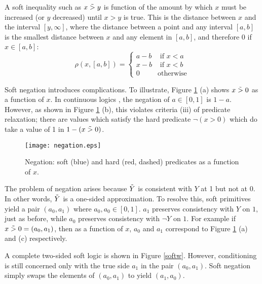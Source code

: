 A soft inequality such as $x \mathrel{\tilde{>}} y$ is function of the amount by which $x$ must be increased (or $y$ decreased) until $x > y$ is true.
This is the distance between $x$ and the interval $[y, \infty]$, where the distance between a point and any interval $[a, b]$ is the smallest distance between $x$ and any element in $[a, b]$, and therefore 0 if $x \in [a, b]$:
\begin{equation}
\rho(x, [a, b]) =
\begin{cases}
  a - b & \text{ if } x < a\\
  x - b & \text{ if } x < b\\
  0              & \text{otherwise}
\end{cases}
\end{equation}

Soft negation introduces complications.
To illustrate, Figure \ref{negationimg} (a) shows $x \mathrel{\tilde{>}} 0$ as a function of $x$.
In continuous logics \cite{kimmig2012short}, the negation of $a \in [0, 1]$ is $1 - a$.
However, as shown in Figure \ref{negationimg} (b), this violates criteria (iii) of predicate relaxation; there are values which satisfy the hard predicate $\neg(x > 0)$ which do take a value of 1 in $1 - (x \mathrel{\tilde{>}} 0)$.


\begin{figure}
\texttt{[image: negation.eps]}
\caption{Negation: soft (blue) and hard (red, dashed) predicates as a function of $x$.  }\label{negationimg}
\end{figure}


The problem of negation arises because $\tilde{Y}$ is consistent with $Y$ at 1 but not at 0.
In other words, $\tilde{Y}$ is a one-sided approximation.
To resolve this, soft primitives yield a pair $(a_0, a_1)$ where $a_0, a_0 \in [0, 1]$.
$a_1$ preserves consistency with $Y$ on $1$, just as before, while $a_0$ preserves consistency with $\neg Y$ on $1$.
For example if $x \mathrel{\tilde{>}} 0 = (a_0, a_1)$, then as a function of $x$, $a_0$ and $a_1$ correspond to Figure \ref{negationimg} (a) and (c) respectively.

A complete two-sided soft logic is shown in Figure \ref{softw}.
However, conditioning is still concerned only with the true side $a_1$ in the pair $(a_0, a_1)$.
Soft negation simply swaps the elements of $(a_0, a_1)$ to yield $(a_1, a_0)$.


